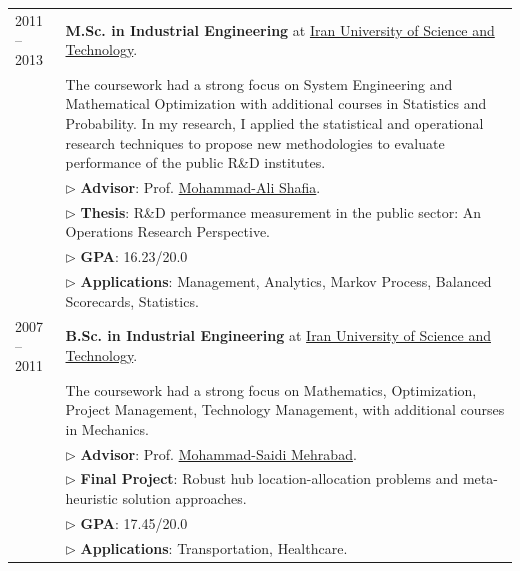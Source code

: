 \documentclass[10PT,letter]{article}
\begin{document}
\begin{tabular}{lp{5.5in}}
	            \textsc{2011 -- 2013} & \textbf{M.Sc. in Industrial Engineering} at \href{http://www.iust.ac.ir/en}{Iran University of Science and Technology}.\\[.5mm]
	            & The coursework had a strong focus on System Engineering and Mathematical Optimization with additional courses in Statistics and Probability. In my research, I applied the statistical and operational research techniques  to propose new methodologies to evaluate  performance of the public R\&D institutes.\\[.5mm]
	            & $\triangleright$ {\small\textbf{Advisor}}:  Prof. \href{https://scholar.google.com/citations?hl=en\&user=GV4tnu4AAAAJ\&view_op=list_works\&sortby=pubdate}{Mohammad-Ali Shafia}.\\[1.1mm]
	            & $\triangleright$ {\small\textbf{Thesis}}: R\&D performance measurement in the public sector: An Operations Research Perspective.\\
	            & $\triangleright$ {\small\textbf{GPA}}: 16.23/20.0\\
	            & $\triangleright$ {\small\textbf{Applications}}: Management, Analytics, Markov Process, Balanced Scorecards, Statistics.\\[4mm]
				\textsc{2007 -- 2011} & \textbf{B.Sc. in Industrial Engineering} at \href{http://www.iust.ac.ir/en}{Iran University of Science and Technology}.\\[.5mm]
				& The coursework had a strong focus on Mathematics, Optimization, Project Management, Technology Management,  with additional courses in Mechanics. \\[.5mm]
				& $\triangleright$ {\small\textbf{Advisor}}:  Prof. \href{http://ie.iust.ac.ir/page.php?slct_pg_id=5442\&sid=61\&slc_lang=en}{Mohammad-Saidi Mehrabad}.\\[1.1mm]
				& $\triangleright$ {\small\textbf{Final Project}}: Robust hub location-allocation problems and meta-heuristic solution approaches.\\
				& $\triangleright$ {\small\textbf{GPA}}: 17.45/20.0\\
				& $\triangleright$ {\small\textbf{Applications}}:  Transportation, Healthcare.
        \end{tabular}
\end{document}
